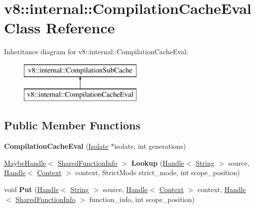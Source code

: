\hypertarget{classv8_1_1internal_1_1_compilation_cache_eval}{}\section{v8\+:\+:internal\+:\+:Compilation\+Cache\+Eval Class Reference}
\label{classv8_1_1internal_1_1_compilation_cache_eval}
Inheritance diagram for v8\+:\+:internal\+:\+:Compilation\+Cache\+Eval\+:\begin{figure}[H]
\begin{center}
\leavevmode
\includegraphics[height=2.000000cm]{classv8_1_1internal_1_1_compilation_cache_eval}
\end{center}
\end{figure}
\subsection*{Public Member Functions}
\begin{DoxyCompactItemize}
\item 
\hypertarget{classv8_1_1internal_1_1_compilation_cache_eval_a992bb47844f5dd0372ef595c20fabbf9}{}{\bfseries Compilation\+Cache\+Eval} (\hyperlink{classv8_1_1internal_1_1_isolate}{Isolate} $\ast$isolate, int generations)\label{classv8_1_1internal_1_1_compilation_cache_eval_a992bb47844f5dd0372ef595c20fabbf9}

\item 
\hypertarget{classv8_1_1internal_1_1_compilation_cache_eval_acf40953d788dc5a39d2c5ed970e7652b}{}\hyperlink{classv8_1_1internal_1_1_maybe_handle}{Maybe\+Handle}$<$ \hyperlink{classv8_1_1internal_1_1_shared_function_info}{Shared\+Function\+Info} $>$ {\bfseries Lookup} (\hyperlink{classv8_1_1internal_1_1_handle}{Handle}$<$ \hyperlink{classv8_1_1internal_1_1_string}{String} $>$ source, \hyperlink{classv8_1_1internal_1_1_handle}{Handle}$<$ \hyperlink{classv8_1_1internal_1_1_context}{Context} $>$ context, Strict\+Mode strict\+\_\+mode, int scope\+\_\+position)\label{classv8_1_1internal_1_1_compilation_cache_eval_acf40953d788dc5a39d2c5ed970e7652b}

\item 
\hypertarget{classv8_1_1internal_1_1_compilation_cache_eval_a92dfe17df272394ce1fc0a38dfb809b2}{}void {\bfseries Put} (\hyperlink{classv8_1_1internal_1_1_handle}{Handle}$<$ \hyperlink{classv8_1_1internal_1_1_string}{String} $>$ source, \hyperlink{classv8_1_1internal_1_1_handle}{Handle}$<$ \hyperlink{classv8_1_1internal_1_1_context}{Context} $>$ context, \hyperlink{classv8_1_1internal_1_1_handle}{Handle}$<$ \hyperlink{classv8_1_1internal_1_1_shared_function_info}{Shared\+Function\+Info} $>$ function\+\_\+info, int scope\+\_\+position)\label{classv8_1_1internal_1_1_compilation_cache_eval_a92dfe17df272394ce1fc0a38dfb809b2}

\end{DoxyCompactItemize}

